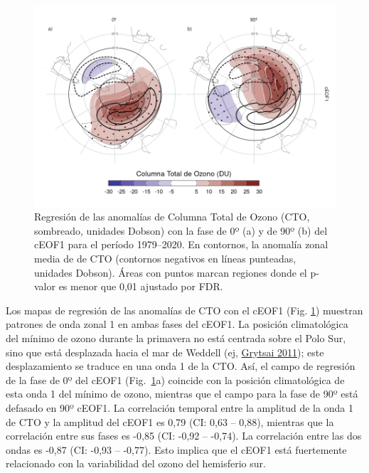 \documentclass[12pt,oneside,a4paper]{reedthesis}
\begin{document}
\begin{figure}

{\centering \includegraphics{figures/20-ceofs/o3-regr-1} 

}

\caption{Regresión de las anomalías de Columna Total de Ozono (CTO, sombreado, unidades Dobson) con la fase de 0º (a) y de 90º (b) del cEOF1 para el período 1979--2020. En contornos, la anomalía zonal media de de CTO (contornos negativos en líneas punteadas, unidades Dobson). Áreas con puntos marcan regiones donde el p-valor es menor que 0,01 ajustado por FDR.}\label{fig:o3-regr}
\end{figure}



Los mapas de regresión de las anomalías de CTO con el cEOF1 (Fig. \ref{fig:o3-regr}) muestran patrones de onda zonal 1 en ambas fases del cEOF1.
La posición climatológica del mínimo de ozono durante la primavera no está centrada sobre el Polo Sur, sino que está desplazada hacia el mar de Weddell (ej, \protect\hyperlink{ref-grytsai2011}{Grytsai 2011}); este desplazamiento se traduce en una onda 1 de la CTO.
Así, el campo de regresión de la fase de 0º del cEOF1 (Fig.~\ref{fig:o3-regr}a) coincide con la posición climatológica de esta onda 1 del mínimo de ozono, mientras que el campo para la fase de 90º está defasado en 90º cEOF1.
La correlación temporal entre la amplitud de la onda 1 de CTO y la amplitud del cEOF1 es 0,79 (CI: 0,63 -- 0,88), mientras que la correlación entre sus fases es -0,85 (CI: -0,92 -- -0,74).
La correlación entre las dos ondas es -0,87 (CI: -0,93 -- -0,77).
Esto implica que el cEOF1 está fuertemente relacionado con la variabilidad del ozono del hemisferio sur.
\end{document}

